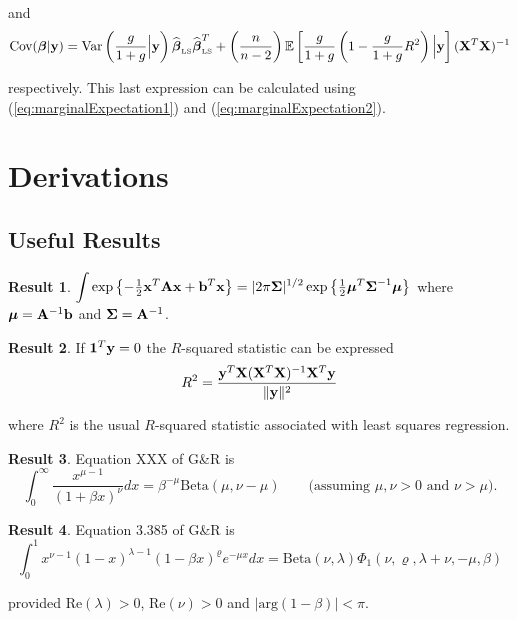 \documentclass{article}
\def\vectorfontone{\bf}
\def\vectorfonttwo{\boldsymbol}
\def\vb{{\vectorfontone b}}                      %
\def\vx{{\vectorfontone x}}                      %
\def\vy{{\vectorfontone y}}                      %
\def\vone{{\vectorfontone 1}}
\def\vbeta{{\vectorfonttwo \beta}}               %
\def\vmu{{\vectorfonttwo \mu}}                   %
\def\matrixfontone{\bf}
\def\matrixfonttwo{\boldsymbol}
\def\mA{{\matrixfontone A}}                      %
\def\mX{{\matrixfontone X}}                      %
\def\mSigma{{\matrixfonttwo \Sigma}}             %
\def\bE{{\mathbb E}}                             %
\def\ds{\displaystyle}
\theoremstyle{definition}
\newtheorem{res}{Result}%
\begin{document}
\noindent and
$$
\mbox{Cov}(\vbeta|\vy)
= \mbox{Var}\left( \frac{g}{1 + g} \Big| \vy \right) \widehat{\vbeta}_{\mbox{\tiny LS}}\widehat{\vbeta}_{\mbox{\tiny LS}}^T
+ \left( \frac{n}{n - 2} \right) \bE \left[ \frac{g}{1+g} \left( 
1 -
\frac{g}{1+g} R^2\right) \Big|\vy \right] (\mX^T\mX)^{-1}
$$

\noindent respectively. This last expression can be calculated using
(\ref{eq:marginalExpectation1}) and (\ref{eq:marginalExpectation2}).


\section{Derivations}


\subsection{Useful Results}	

\begin{res}\label{res:01}
$
\ds \int \exp\left\{ -\tfrac{1}{2}\vx^T\mA\vx + \vb^T\vx \right\} = |2\pi\mSigma|^{1/2} \exp\left\{ \tfrac{1}{2}\vmu^T\mSigma^{-1}\vmu \right\}
$ where $\vmu = \mA^{-1}\vb$ and $\mSigma = \mA^{-1}$.
\end{res}
 
\begin{res} \label{res:02}
If $\vone^T\vy=0$ the $R$-squared statistic can be expressed
$$
\ds R^2 = \frac{\vy^T\mX(\mX^T\mX)^{-1}\mX^T\vy}{\|\vy\|^2}
$$

\noindent 
where $R^2$ is the usual $R$-squared statistic associated with least squares regression.
\end{res}

\begin{res} \label{res:03}
Equation XXX of G\&R is
$$
\int_0^\infty \frac{ x^{\mu - 1} }{(1 + \beta x)^\nu} dx = \beta^{-\mu} \mbox{Beta}(\mu,\nu - \mu) \quad \quad \mbox{(assuming $\mu,\nu>0$ and $\nu>\mu$).}
$$
\end{res}

\begin{res} \label{res:04}
Equation 3.385 of G\&R is
$$
\int_{0}^1 x^{\nu - 1} (1 - x)^{\lambda - 1}(1 - \beta x)^{\varrho} e^{-\mu x} dx = \mbox{Beta}(\nu,\lambda) \Phi_1(\nu,\varrho,\lambda+\nu,-\mu,\beta)
$$

\noindent provided $\mbox{Re}(\lambda)>0$, $\mbox{Re}(\nu)>0$ and $|\mbox{arg}(1-\beta)|<\pi$.
\end{res}
\end{document}
